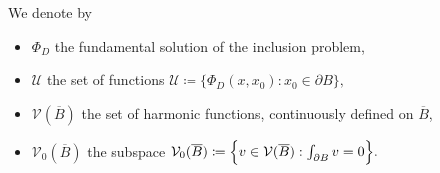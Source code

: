 \documentclass[10pt,xcolor={dvipsnames}]{beamer}
\theoremstyle{plain}
\theoremstyle{plain}
\begin{document}
\begin{frame}
\vspace{0.2cm}
We denote by
\begin{itemize}
 \item $\Phi_D$ the fundamental solution of the inclusion problem,
 \item $\mathcal{U}$ the set of functions
$
 \mathcal{U}\coloneqq\bigl\{\Phi_D(x, x_0): x_0\in \partial B\bigr\},
$
 \item $\mathcal{V}(\overline{B})$ the set of harmonic functions, continuously defined on $\overline{B}$,
 \item $\mathcal{V}_0(\overline{B})$ the subspace 
$
  \mathcal{V}_0(\overline{B})\coloneqq\Bigl\{v\in\mathcal{V}(\overline{B}):\int_{\partial B} v = 0\Bigr\}.
$
\end{itemize}
\end{frame}
\end{document}
